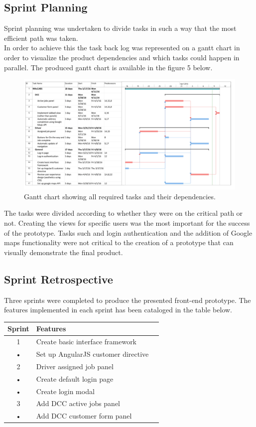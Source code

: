 \documentclass[12pt]{article}
\begin{document}
\subsection{Sprint Planning}
Sprint planning was undertaken to divide tasks in such a way that the most efficient path was taken.\\

In order to achieve this the task back log was represented on a gantt chart in order to visualize the product dependencies and which tasks could happen in parallel. The produced gantt chart is available in the figure 5 below.\\

\begin{figure}[ht]
\centering
\label{gantt}
\includegraphics[width=1\textwidth]{gantt.png}
\caption{Gantt chart showing all required tasks and their dependencies.}
\end{figure}

The tasks were divided according to whether they were on the critical path or not. Creating the views for specific users was the most important for the success of the prototype. Tasks such and login authentication and the addition of Google maps functionality were not critical to the creation of a prototype that can visually demonstrate the final product.
\subsection{Sprint Retrospective}
Three sprints were completed to produce the presented front-end prototype. The features implemented in each sprint has been cataloged in the table below.\\

\begin{tabular}{|c|l|c|}
\hline 
Sprint & Features\\ 
\hline 
 1 & Create basic interface framework\\ 
• & Set up AngularJS customer directive\\

\hline 
 2 & Driver assigned job panel\\
• & Create default login page\\
• & Create login modal\\
\hline 
 3 & Add DCC active jobs panel \\ 
 • & Add DCC customer form panel\\
 

\hline
\end{tabular} 
\end{document}
